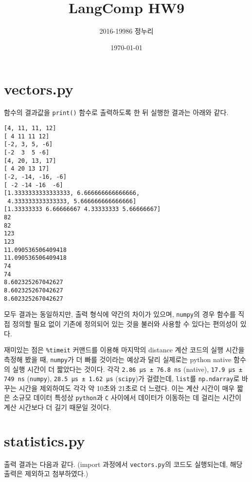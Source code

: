 \documentclass[a4paper,11pt]{scrartcl}
\title{\vspace{-0.5in}LangComp HW9}
\author{\vspace{-15pt}2016-19986 정누리}
\date{\vspace{-5pt}\today}
\begin{document}
\maketitle

\section*{vectors.py}

함수의 결과값을 \lstinline{print()} 함수로 출력하도록 한 뒤 실행한 결과는 아래와 같다.

\begin{lstlisting}
[4, 11, 11, 12]
[ 4 11 11 12]
[-2, 3, 5, -6]
[-2  3  5 -6]
[4, 20, 13, 17]
[ 4 20 13 17]
[-2, -14, -16, -6]
[ -2 -14 -16  -6]
[1.3333333333333333, 6.666666666666666,
 4.333333333333333, 5.666666666666666]
[1.33333333 6.66666667 4.33333333 5.66666667]
82
82
123
123
11.090536506409418
11.090536506409418
74
74
8.602325267042627
8.602325267042627
8.602325267042627
\end{lstlisting}

모두 결과는 동일하지만, 출력 형식에 약간의 차이가 있으며, \lstinline{numpy}의 경우 함수를 직접 정의할 필요 없이 기존에 정의되어 있는 것을 불러와 사용할 수 있다는 편의성이 있다.

재미있는 점은 \lstinline{%timeit} 커맨드를 이용해 마지막의 distance 계산 코드의 실행 시간을 측정해 봤을 때, \lstinline{numpy}가 더 빠를 것이라는 예상과 달리 실제로는 python native 함수의 실행 시간이 더 짧았다는 것이다. 각각 \lstinline{2.86 µs ± 76.8 ns} (native), \lstinline{17.9 µs ± 749 ns} (\lstinline{numpy}), \lstinline{28.5 µs ± 1.62 µs} (\lstinline{scipy})가 걸렸는데, \lstinline{list}를 \lstinline{np.ndarray}로 바꾸는 시간을 제외하여도 각각 약 10초와 21초로 더 느렸다. 이는 계산 시간이 매우 짧은 소규모 데이터 특성상 \lstinline{python}과 \lstinline{C} 사이에서 데이터가 이동하는 데 걸리는 시간이 계산 시간보다 더 길기 때문일 것이다.

\section*{statistics.py}

출력 결과는 다음과 같다. (import 과정에서 \lstinline{vectors.py}의 코드도 실행되는데, 해당 출력은 제외하고 첨부하였다.)
\end{document}

